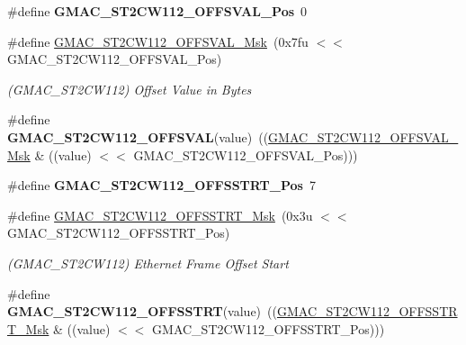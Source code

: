 \begin{DoxyCompactItemize}
\item 
\mbox{\label{group__SAME70__GMAC_gab32103b25739c6113e8076d7723e0db9}} 
\#define {\bfseries G\+M\+A\+C\+\_\+\+S\+T2\+C\+W112\+\_\+\+O\+F\+F\+S\+V\+A\+L\+\_\+\+Pos}~0
\item 
\mbox{\label{group__SAME70__GMAC_gad3513359ab4b674dff11d2b90e5683cf}} 
\#define \mbox{\hyperlink{group__SAME70__GMAC_gad3513359ab4b674dff11d2b90e5683cf}{G\+M\+A\+C\+\_\+\+S\+T2\+C\+W112\+\_\+\+O\+F\+F\+S\+V\+A\+L\+\_\+\+Msk}}~(0x7fu $<$$<$ G\+M\+A\+C\+\_\+\+S\+T2\+C\+W112\+\_\+\+O\+F\+F\+S\+V\+A\+L\+\_\+\+Pos)
\begin{DoxyCompactList}\small\item\em (G\+M\+A\+C\+\_\+\+S\+T2\+C\+W112) Offset Value in Bytes \end{DoxyCompactList}\item 
\mbox{\label{group__SAME70__GMAC_ga77281bb6ee2dd0b756cb3f06b80d7e55}} 
\#define {\bfseries G\+M\+A\+C\+\_\+\+S\+T2\+C\+W112\+\_\+\+O\+F\+F\+S\+V\+AL}(value)~((\mbox{\hyperlink{group__SAMV71__GMAC_gad3513359ab4b674dff11d2b90e5683cf}{G\+M\+A\+C\+\_\+\+S\+T2\+C\+W112\+\_\+\+O\+F\+F\+S\+V\+A\+L\+\_\+\+Msk}} \& ((value) $<$$<$ G\+M\+A\+C\+\_\+\+S\+T2\+C\+W112\+\_\+\+O\+F\+F\+S\+V\+A\+L\+\_\+\+Pos)))
\item 
\mbox{\label{group__SAME70__GMAC_ga200e36627f7e0273af825b2db8840cfa}} 
\#define {\bfseries G\+M\+A\+C\+\_\+\+S\+T2\+C\+W112\+\_\+\+O\+F\+F\+S\+S\+T\+R\+T\+\_\+\+Pos}~7
\item 
\mbox{\label{group__SAME70__GMAC_ga8f0552054787f6a9bacefb4c1616c6c2}} 
\#define \mbox{\hyperlink{group__SAME70__GMAC_ga8f0552054787f6a9bacefb4c1616c6c2}{G\+M\+A\+C\+\_\+\+S\+T2\+C\+W112\+\_\+\+O\+F\+F\+S\+S\+T\+R\+T\+\_\+\+Msk}}~(0x3u $<$$<$ G\+M\+A\+C\+\_\+\+S\+T2\+C\+W112\+\_\+\+O\+F\+F\+S\+S\+T\+R\+T\+\_\+\+Pos)
\begin{DoxyCompactList}\small\item\em (G\+M\+A\+C\+\_\+\+S\+T2\+C\+W112) Ethernet Frame Offset Start \end{DoxyCompactList}\item 
\mbox{\label{group__SAME70__GMAC_ga58e7e69a105be78e0ce2ec76973cb951}} 
\#define {\bfseries G\+M\+A\+C\+\_\+\+S\+T2\+C\+W112\+\_\+\+O\+F\+F\+S\+S\+T\+RT}(value)~((\mbox{\hyperlink{group__SAMV71__GMAC_ga8f0552054787f6a9bacefb4c1616c6c2}{G\+M\+A\+C\+\_\+\+S\+T2\+C\+W112\+\_\+\+O\+F\+F\+S\+S\+T\+R\+T\+\_\+\+Msk}} \& ((value) $<$$<$ G\+M\+A\+C\+\_\+\+S\+T2\+C\+W112\+\_\+\+O\+F\+F\+S\+S\+T\+R\+T\+\_\+\+Pos)))

\end{DoxyCompactItemize}
